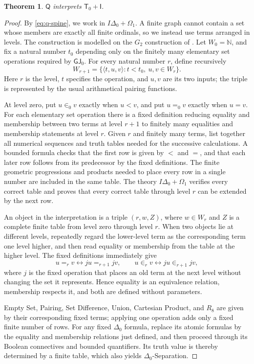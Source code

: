 \documentclass[11pt,a4paper]{article}
\newcommand{\N}{\mathbb N}
\newcommand{\Q}{\mathsf Q}
\newcommand{\IDelta}{I\Delta_{0}}
\newcommand{\OmegaOne}{\Omega_{1}}
\newcommand{\GJ}{\mathsf{GJ}_{0}}
\newcommand{\Tzero}{\mathsf T_{0}}
\newcommand{\Inf}{\mathsf I}
\theoremstyle{plain}
\newtheorem{theorem}{Theorem}[section]
\theoremstyle{definition}
\theoremstyle{remark}
\begin{document}
\begin{theorem}
  \(\Q\) interprets \(\Tzero+\Inf\).
\end{theorem}
\begin{proof}
  By \eqref{eq:q-spine}, we work in \(\IDelta+\OmegaOne\). A finite graph cannot contain a set whose members are exactly all finite ordinals, so we instead use terms arranged in levels. The construction is modelled on the \(G_2\) construction of \citet{Mathias2006}. Let \(W_0=\N\), and fix a natural number \(t_0\) depending only on the finitely many elementary set operations required by \(\GJ\). For every natural number \(r\), define recursively
  \[
    W_{r+1}=\{\langle t,u,v\rangle:t<t_0,\ u,v\in W_r\}.
  \]
  Here \(r\) is the level, \(t\) specifies the operation, and \(u,v\) are its two inputs; the triple is represented by the usual arithmetical pairing functions.

  At level zero, put \(u\in_0v\) exactly when \(u<v\), and put \(u=_0v\) exactly when \(u=v\). For each elementary set operation there is a fixed definition reducing equality and membership between two terms at level \(r+1\) to finitely many equalities and membership statements at level \(r\). Given \(r\) and finitely many terms, list together all numerical sequences and truth tables needed for the successive calculations. A bounded formula checks that the first row is given by \(<\) and \(=\), and that each later row follows from its predecessor by the fixed definitions. The finite geometric progressions and products needed to place every row in a single number are included in the same table. The theory \(\IDelta+\OmegaOne\) verifies every correct table and proves that every correct table through level \(r\) can be extended by the next row.

  An object in the interpretation is a triple \((r,w,Z)\), where \(w\in W_r\) and \(Z\) is a complete finite table from level zero through level \(r\). When two objects lie at different levels, repeatedly regard the lower-level term as the corresponding term one level higher, and then read equality or membership from the table at the higher level. The fixed definitions immediately give
  \[
    u=_rv\longleftrightarrow ju=_{r+1}jv,
    \qquad
    u\in_rv\longleftrightarrow ju\in_{r+1}jv,
  \]
  where \(j\) is the fixed operation that places an old term at the next level without changing the set it represents. Hence equality is an equivalence relation, membership respects it, and both are defined without parameters.

  Empty Set, Pairing, Set Difference, Union, Cartesian Product, and \(R_8\) are given by their corresponding fixed terms; applying one operation adds only a fixed finite number of rows. For any fixed \(\Delta_0\) formula, replace its atomic formulas by the equality and membership relations just defined, and then proceed through its Boolean connectives and bounded quantifiers. Its truth value is thereby determined by a finite table, which also yields \(\Delta_0\)-Separation.


\end{proof}
\end{document}
